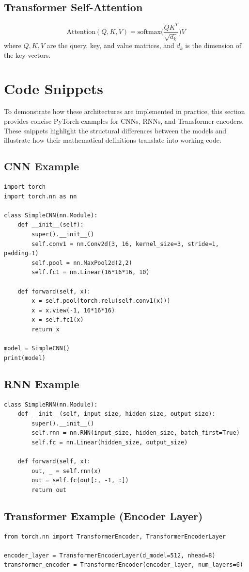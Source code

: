 \documentclass[12pt]{article}
\begin{document}
\subsection{Transformer Self-Attention}
\[
\text{Attention}(Q, K, V) = \text{softmax}\Big(\frac{QK^T}{\sqrt{d_k}}\Big)V
\]
where \(Q, K, V\) are the query, key, and value matrices, and \(d_k\) is the dimension of the key vectors.

\newpage
\section{Code Snippets}
To demonstrate how these architectures are implemented in practice, this
section provides concise PyTorch examples for CNNs, RNNs, and Transformer
encoders. These snippets highlight the structural differences between the
models and illustrate how their mathematical definitions translate into
working code.
\subsection{CNN Example}
\begin{lstlisting}
import torch
import torch.nn as nn

class SimpleCNN(nn.Module):
    def __init__(self):
        super().__init__()
        self.conv1 = nn.Conv2d(3, 16, kernel_size=3, stride=1, padding=1)
        self.pool = nn.MaxPool2d(2,2)
        self.fc1 = nn.Linear(16*16*16, 10)
        
    def forward(self, x):
        x = self.pool(torch.relu(self.conv1(x)))
        x = x.view(-1, 16*16*16)
        x = self.fc1(x)
        return x

model = SimpleCNN()
print(model)
\end{lstlisting}

\subsection{RNN Example}
\begin{lstlisting}
class SimpleRNN(nn.Module):
    def __init__(self, input_size, hidden_size, output_size):
        super().__init__()
        self.rnn = nn.RNN(input_size, hidden_size, batch_first=True)
        self.fc = nn.Linear(hidden_size, output_size)
        
    def forward(self, x):
        out, _ = self.rnn(x)
        out = self.fc(out[:, -1, :])
        return out
\end{lstlisting}

\subsection{Transformer Example (Encoder Layer)}
\begin{lstlisting}
from torch.nn import TransformerEncoder, TransformerEncoderLayer

encoder_layer = TransformerEncoderLayer(d_model=512, nhead=8)
transformer_encoder = TransformerEncoder(encoder_layer, num_layers=6)
\end{lstlisting}
\end{document}
